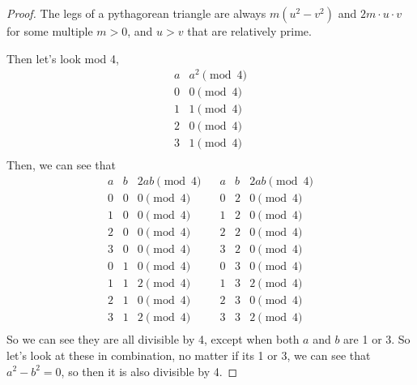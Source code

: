 \documentclass[11pt]{article}
\begin{document}
\begin{proof}
  The legs of a pythagorean triangle are always $m(u^2-v^2)$ and $2m\cdot u\cdot v$ for some multiple $m>0$, and $u>v$ that are relatively prime.

  Then let's look mod 4,
  \[
    \begin{array}{c|c}
      a & a^2 \pmod{4} \\
      \hline
      0 & 0 \pmod{4}   \\
      1 & 1 \pmod{4}   \\
      2 & 0 \pmod{4}   \\
      3 & 1 \pmod{4}   \\
    \end{array}
  \]
  Then, we can see that
  \[
    \begin{array}{c|c|c}
      a & b & 2ab \pmod{4} \\
      \hline
      0 & 0 & 0 \pmod{4}   \\
      1 & 0 & 0 \pmod{4}   \\
      2 & 0 & 0 \pmod{4}   \\
      3 & 0 & 0 \pmod{4}   \\
      0 & 1 & 0 \pmod{4}   \\
      1 & 1 & 2 \pmod{4}   \\
      2 & 1 & 0 \pmod{4}   \\
      3 & 1 & 2 \pmod{4}   \\
    \end{array}\;\;\;
    \begin{array}{c|c|c}
      a & b & 2ab \pmod{4} \\
      \hline
      0 & 2 & 0 \pmod{4}   \\
      1 & 2 & 0 \pmod{4}   \\
      2 & 2 & 0 \pmod{4}   \\
      3 & 2 & 0 \pmod{4}   \\
      0 & 3 & 0 \pmod{4}   \\
      1 & 3 & 2 \pmod{4}   \\
      2 & 3 & 0 \pmod{4}   \\
      3 & 3 & 2 \pmod{4}   \\
    \end{array}
  \]
  So we can see they are all divisible by 4, except when both $a$ and $b$ are 1 or 3. So let's look at these in combination, no matter if its 1 or 3, we can see that $a^2-b^2=0$, so then it is also divisible by 4.


\end{proof}
\end{document}

